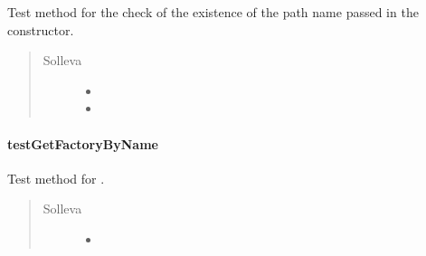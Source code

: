 \documentclass[letterpaper,10pt,italian,openany,oneside]{sphinxmanual}
\begin{document}
\begin{fulllineitems}
\label{\detokenize{test/it/unicam/cs/pa/mastermind/test/PlayersFactoryRegistry:it.unicam.cs.pa.mastermind.test.PlayersFactoryRegistry.testCheckRightPathName()}}
Test method for the check of the existence of the path name passed in the constructor.
\begin{quote}\begin{description}
\item[{Solleva}] \leavevmode\begin{itemize}
\item {} 
 \textendash{} 

\item {} 
 \textendash{} 

\end{itemize}

\end{description}\end{quote}

\end{fulllineitems}



\paragraph{testGetFactoryByName}
\label{\detokenize{test/it/unicam/cs/pa/mastermind/test/PlayersFactoryRegistry:testgetfactorybyname}}

\begin{fulllineitems}
\label{\detokenize{test/it/unicam/cs/pa/mastermind/test/PlayersFactoryRegistry:it.unicam.cs.pa.mastermind.test.PlayersFactoryRegistry.testGetFactoryByName()}}
Test method for .
\begin{quote}\begin{description}
\item[{Solleva}] \leavevmode\begin{itemize}
\item {} 
 \textendash{} 

\end{itemize}

\end{description}\end{quote}

\end{fulllineitems}
\end{document}
